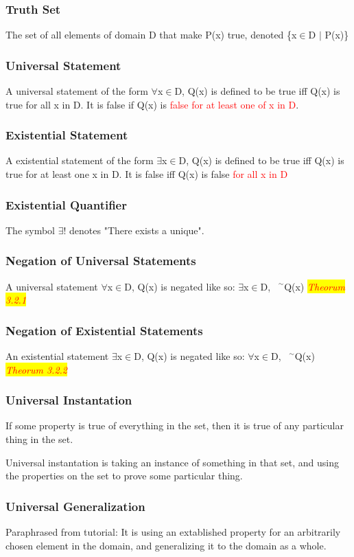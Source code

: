 \documentclass{article}
\newcommand{\negation}{${\phantom{0}}^\sim$}
\newcommand{\theorum}[1]{\quad \quad \colorbox{yellow}{\textit{\textcolor{red}{Theorum #1}}}}
\begin{document}
\subsubsection{Truth Set}
The set of all elements of domain D that make P(x) true, denoted 
\{x$\in$D $\mid$ P(x)\}
\subsubsection{Universal Statement}
A universal statement of the form $\forall$x$\in$D, Q(x) is defined to be true iff Q(x) is true for all x in D. It is false if Q(x) is \textcolor{red}{false for at least one of x in D}.
\subsubsection{Existential Statement}
A existential statement of the form $\exists$x$\in$D, Q(x) is defined to be true iff Q(x) is true for at least one x in D. It is false iff Q(x) is false \textcolor{red}{for all x in D}
\subsubsection{Existential Quantifier}
The symbol $\exists$! denotes "There exists a unique".
\subsubsection{Negation of Universal Statements}
A universal statement $\forall$x$\in$D, Q(x) is negated like so:
$\exists$x$\in$D, \negation Q(x) \theorum{3.2.1}
\subsubsection{Negation of Existential Statements}
An existential statement $\exists$x$\in$D, Q(x) is negated like so:
$\forall$x$\in$D, \negation Q(x) \theorum{3.2.2}
\subsubsection{Universal Instantation}
If some property is true of everything in the set, then it is true of any particular thing in the set.

Universal instantation is taking an instance of something in that set, and using the properties on the set to prove some particular thing.
\subsubsection{Universal Generalization}
Paraphrased from tutorial: It is using an extablished property for an arbitrarily chosen element in the domain, and generalizing it to the domain as a whole.
\end{document}
